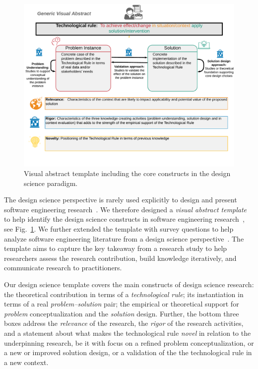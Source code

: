 \documentclass[graybox]{svmult}
\begin{document}
\begin{figure}[t]
\includegraphics[width=1.0\textwidth, trim={0 15mm 0 0},clip]{Figures/GenericVA.png}
\caption{Visual abstract template including the core constructs in the design science paradigm.}
\label{fig:VA-template}      
\end{figure}


The design science perspective is rarely used explicitly to design and present software engineering research~\citep{Engstrom19arxiv}. We therefore designed a \emph{visual abstract template} to help identify the design science constructs in software engineering research~\citep{StoreyESEM17}, see Fig.~\ref{fig:VA-template}. We further extended the template with survey questions to help analyze software engineering literature from a design science perspective~\citep{Engstrom19arxiv}. The template aims to capture the key takeaway from a research study to help researchers assess the research contribution, build knowledge iteratively, and communicate research to practitioners. %

Our design science template covers the main constructs of design science research: the theoretical contribution in terms of a \emph{technological rule}; its instantiation in terms of a real \emph{problem--solution} pair; the empirical or theoretical support for \emph{problem} conceptualization and the \emph{solution} design. Further, the bottom three boxes address the \emph{relevance} of the research, the \emph{rigor} of the research activities, and a statement about what makes the technological rule \emph{novel} in relation to the underpinning research, be it with focus on a refined problem conceptualization, or a new or improved solution design, or a validation of the the technological rule in a new context. 
\end{document}
